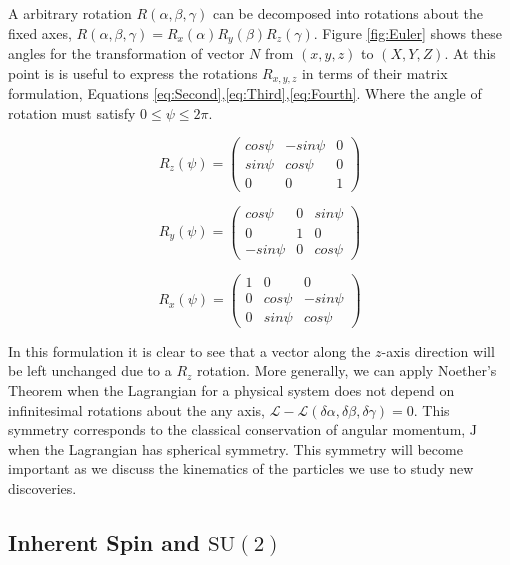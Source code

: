 A arbitrary rotation $R(\alpha, \beta, \gamma)$ can be decomposed into rotations about the fixed axes, $R(\alpha, \beta, \gamma) = R_{x}(\alpha)R_{y}(\beta)R_{z}(\gamma)$. Figure \ref{fig:Euler} shows these angles for the transformation of vector $N$ from $(x,y,z)$ to $(X,Y,Z)$. At this point is is useful to express the rotations $R_{x,y,z}$ in terms of their matrix formulation, Equations \ref{eq:Second},\ref{eq:Third},\ref{eq:Fourth}. Where the angle of rotation must satisfy $0 \leq \psi \leq 2\pi$.

\begin{equation}
\label{eq:Second}
R_{z}(\psi) = \left( \begin{array}{ccc}
cos\psi & -sin\psi & 0 \\
sin\psi & cos\psi & 0 \\
0 & 0 & 1 \end{array} \right)
\end{equation}

\begin{equation}
\label{eq:Third}
R_{y}(\psi) = \left( \begin{array}{ccc}
cos\psi & 0 & sin\psi \\
0 & 1 & 0 \\
-sin\psi & 0 & cos\psi \end{array} \right)
\end{equation}

\begin{equation}
\label{eq:Fourth}
R_{x}(\psi) = \left( \begin{array}{ccc}
1 & 0 & 0 \\
0 & cos\psi & -sin\psi \\
0 & sin\psi & cos\psi \end{array} \right) 
\end{equation}

In this formulation it is clear to see that a vector along the $z$-axis direction will be left unchanged due to a $R_{z}$ rotation. More generally, we can apply Noether's Theorem when the Lagrangian for a physical system does not depend on infinitesimal rotations about the any axis, $\mathscr{L}-\mathscr{L}(\delta\alpha,\delta\beta,\delta\gamma) = 0$. This symmetry corresponds to the classical conservation of angular momentum, $\mathrm{J}$ when the Lagrangian has spherical symmetry. This symmetry will become important as we discuss the kinematics of the particles we use to study new discoveries.

\subsection{Inherent Spin and $\mathrm{SU}(2)$}
\label{sec:SU2}

